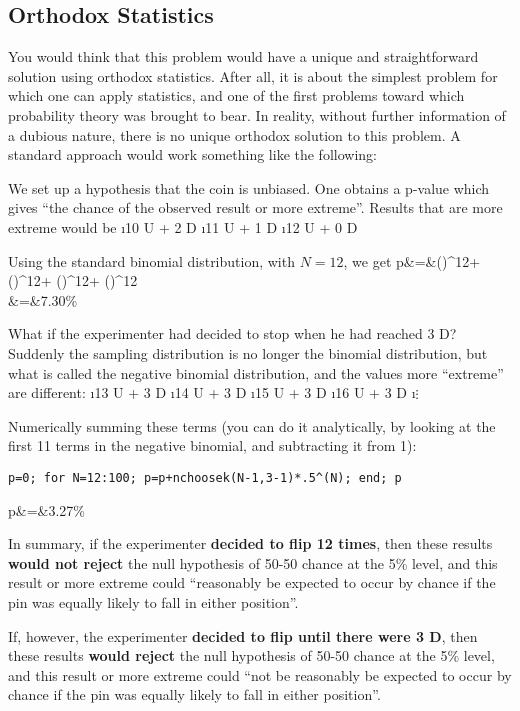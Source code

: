 \subsection{Orthodox Statistics}

You would think that this problem would have a unique and straightforward
solution using orthodox statistics.  After all, it is about the simplest
problem for which one can apply statistics, and one of the first problems
toward which probability theory was brought to bear.  In reality, without
further information of a dubious nature, there is no unique orthodox solution
to this problem.  A standard approach would work something like the following:

We set up a hypothesis that the coin is unbiased.  One obtains a p-value which
gives ``the chance of the observed result or more extreme''.  Results that are
more extreme would be 
\bi
\i 10 U + 2 D
\i 11 U + 1 D
\i 12 U + 0 D
\ei

Using the standard binomial distribution, with $N=12$, we get
\beqn
p&=&\left(\right)^{12}+
    \left(\right)^{12}+
    \left(\right)^{12}+
    \left(\right)^{12} \\
  &=&7.30\%
\eeqn



What if the experimenter had decided to stop when he had reached 3 D?
Suddenly the sampling distribution is no longer the binomial distribution, but
what is called the negative binomial distribution, and the values more
``extreme'' are different:
\bi
\i 13 U + 3 D
\i 14 U + 3 D
\i 15 U + 3 D
\i 16 U + 3 D
\i $\vdots$
\ei

Numerically summing these terms (you can do it analytically, by looking at the
first 11 terms in the negative binomial, and subtracting it from 1):
\begin{verbatim}
p=0; for N=12:100; p=p+nchoosek(N-1,3-1)*.5^(N); end; p
\end{verbatim}

\beqn
p&=&3.27\%
\eeqn

In summary, if the experimenter {\bf decided to flip 12 times}, then these
results {\bf would not reject} the null hypothesis of 50-50 chance at the 5\%
level, and this result or more extreme could ``reasonably be expected to occur
by chance if the pin was equally likely to fall in either
position''\cite{Lindley76}.

If, however, the experimenter {\bf decided to flip until there were 3 D}, then
these results {\bf would reject} the null hypothesis of 50-50 chance at the
5\% level, and this result or more extreme could ``not be reasonably be
expected to occur by chance if the pin was equally likely to fall in either
position''\cite{Lindley76}.

